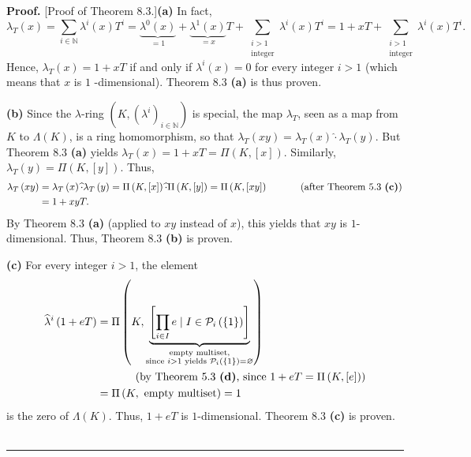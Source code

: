 \documentclass[numbers=enddot,12pt,final,onecolumn,notitlepage]{scrartcl}%
\newenvironment{proof}[1][Proof]{\noindent\textbf{#1.} }{\ \rule{0.5em}{0.5em}}
\begin{document}
\begin{proof}
[Proof of Theorem 8.3.]\textbf{(a)} In fact,%
\[
\lambda_{T}\left(  x\right)  =\sum\limits_{i\in\mathbb{N}}\lambda^{i}\left(
x\right)  T^{i}=\underbrace{\lambda^{0}\left(  x\right)  }_{=1}%
+\underbrace{\lambda^{1}\left(  x\right)  }_{=x}T+\sum
\limits_{\substack{i>1\\\text{integer}}}\lambda^{i}\left(  x\right)
T^{i}=1+xT+\sum\limits_{\substack{i>1\\\text{integer}}}\lambda^{i}\left(
x\right)  T^{i}.
\]
Hence, $\lambda_{T}\left(  x\right)  =1+xT$ if and only if $\lambda^{i}\left(
x\right)  =0$ for every integer $i>1$ (which means that $x$ is $1$%
-dimensional). Theorem 8.3 \textbf{(a)} is thus proven.

\textbf{(b)} Since the $\lambda$-ring $\left(  K,\left(  \lambda^{i}\right)
_{i\in\mathbb{N}}\right)  $ is special, the map $\lambda_{T}$, seen as a map
from $K$ to $\Lambda\left(  K\right)  $, is a ring homomorphism, so that
$\lambda_{T}\left(  xy\right)  =\lambda_{T}\left(  x\right)  \widehat{\cdot
}\lambda_{T}\left(  y\right)  $. But Theorem 8.3 \textbf{(a)} yields
$\lambda_{T}\left(  x\right)  =1+xT=\Pi\left(  K,\left[  x\right]  \right)  $.
Similarly, $\lambda_{T}\left(  y\right)  =\Pi\left(  K,\left[  y\right]
\right)  $. Thus,%
\begin{align*}
\lambda_{T}\left(  xy\right)   &  =\lambda_{T}\left(  x\right)  \widehat{\cdot
}\lambda_{T}\left(  y\right)  =\Pi\left(  K,\left[  x\right]  \right)
\widehat{\cdot}\Pi\left(  K,\left[  y\right]  \right)  =\Pi\left(  K,\left[
xy\right]  \right)  \ \ \ \ \ \ \ \ \ \ \left(  \text{after Theorem 5.3
\textbf{(c)}}\right) \\
&  =1+xyT.
\end{align*}
By Theorem 8.3 \textbf{(a)} (applied to $xy$ instead of $x$), this yields that
$xy$ is $1$-dimensional. Thus, Theorem 8.3 \textbf{(b)} is proven.

\textbf{(c)} For every integer $i>1$, the element%
\begin{align*}
\widehat{\lambda}^{i}\left(  1+eT\right)   &  =\Pi\left(
K,\underbrace{\left[  \prod_{i\in I}e\mid I\in\mathcal{P}_{i}\left(  \left\{
1\right\}  \right)  \right]  }_{\substack{\text{empty multiset,}\\\text{since
}i>1\text{ yields }\mathcal{P}_{i}\left(  \left\{  1\right\}  \right)
=\varnothing}}\right) \\
&  \ \ \ \ \ \ \ \ \ \ \left(  \text{by Theorem 5.3 \textbf{(d)}, since
}1+eT=\Pi\left(  K,\left[  e\right]  \right)  \right) \\
&  =\Pi\left(  K,\text{ empty multiset}\right)  =1
\end{align*}
is the zero of $\Lambda\left(  K\right)  $. Thus, $1+eT$ is $1$-dimensional.
Theorem 8.3 \textbf{(c)} is proven.
\end{proof}
\end{document}
